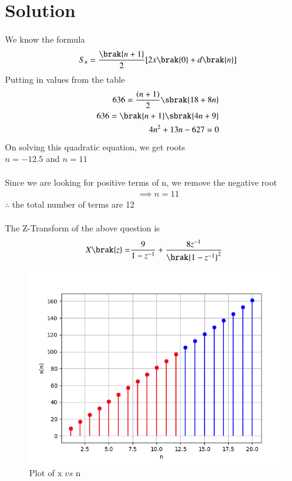 \documentclass[journal,12pt,twocolumn]{IEEEtran}
\theoremstyle{remark}
\begin{document}
\section{Solution}
\fi

We know the formula
\begin{align}
S_n = \frac{\brak{n+1}}{2}[2x\brak{0}+d\brak{n}]
\end{align}
Putting in values from the table\\
\begin{align}
  636 = \frac{(n+1)}{2}\sbrak{18 + 8n} \\
  636 = \brak{n+1}\sbrak{4n + 9}\\
  4n^2 +13n -627= 0
\end{align}
On solving this quadratic equation, we get roots\\ $ n = -12.5$ and $ n = 11$\\
\\
Since we are looking for positive terms of n, we remove the negative root
\begin{align}
\implies n = 11
\end{align}
$\therefore$ the total number of terms are 12
\\
\\
The Z-Transform of the above question is
\begin{align}
X\brak{z}= &\frac9{1-z^{-1}} + \frac{8z^{-1}}{\brak{1-z^{-1}}^{2}}
\end{align}
\begin{figure}[ht]
    \centering
    \includegraphics[width=\columnwidth]{ncert-maths/10/5/2/4/figs/fig1.png}
    \caption{Plot of x $vs$ n}
\end{figure}
\end{document}
